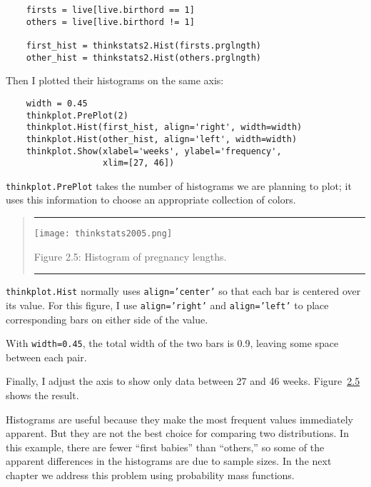 \documentclass[]{book}
\begin{document}
\begin{verbatim}
    firsts = live[live.birthord == 1]
    others = live[live.birthord != 1]

    first_hist = thinkstats2.Hist(firsts.prglngth)
    other_hist = thinkstats2.Hist(others.prglngth)
\end{verbatim}

Then I plotted their histograms on the
same axis:

\begin{verbatim}
    width = 0.45
    thinkplot.PrePlot(2)
    thinkplot.Hist(first_hist, align='right', width=width)
    thinkplot.Hist(other_hist, align='left', width=width)
    thinkplot.Show(xlabel='weeks', ylabel='frequency',
                   xlim=[27, 46])
\end{verbatim}

\texttt{thinkplot.PrePlot} takes the number
of histograms we are planning to plot; it uses this information to
choose an appropriate collection of colors.

\begin{quote}
\begin{center}\rule{0.5\linewidth}{\linethickness}\end{center}

\texttt{[image: thinkstats2005.png]}

Figure 2.5: Histogram of pregnancy lengths.

\protect\hypertarget{first_nsfg_hist}{}{}

\begin{center}\rule{0.5\linewidth}{\linethickness}\end{center}
\end{quote}

\texttt{thinkplot.Hist} normally uses \texttt{align=’center’} so that each bar is
centered over its value. For this figure, I use \texttt{align=’right’} and \texttt{align=’left’} to place corresponding
bars on either side of the value.

With \texttt{width=0.45}, the total width of the
two bars is 0.9, leaving some space between each pair.

Finally, I adjust the axis to show only
data between 27 and 46 weeks. Figure~\protect\hyperlink{first_nsfg_hist}{2.5} shows the result.

Histograms are useful because they make
the most frequent values immediately apparent. But they are not the best
choice for comparing two distributions. In this example, there are fewer
``first babies'' than ``others,'' so some of the apparent differences in the
histograms are due to sample sizes. In the next chapter we address this
problem using probability mass functions.
\end{document}
